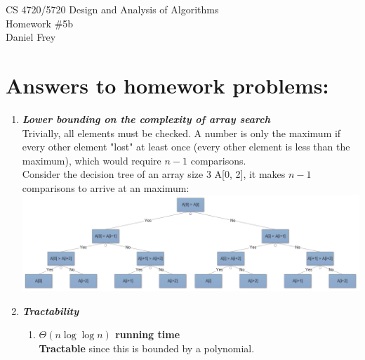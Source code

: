 \documentclass[11pt]{article}
\begin{document}
 

\rhead{\today}

\begin{center}
\begin{Large}
	CS 4720/5720 Design and Analysis of Algorithms \\
	Homework \#5b \\
	Daniel Frey
\end{Large}
\end{center}

\section*{Answers to homework problems:}

\begin{enumerate}
	\item
		\textbf{\textit{Lower bounding on the complexity of array search}} \\
			\hspace*{.5cm}
			Trivially, all elements must be checked. A number is only the maximum if every other element "lost" at least once (every other element is less than the maximum), which would require $ n-1 $ comparisons. \\
			\hspace*{.5cm}
			Consider the decision tree of an array size 3 A[0, 2], it makes $ n-1 $ comparisons to arrive at an maximum: \\
			\includegraphics[width=\textwidth]{"Decision Tree"} \\

	\item
		\textbf{\textit{Tractability}} \\
		\begin{enumerate}
		\item
			\textbf{\textit{$ \Theta(n \log \log n) $} running time} \\
				\hspace*{.5cm} 
				\textbf{Tractable} since this is bounded by a polynomial. \\
			

\end{enumerate}
\end{enumerate}
\end{document}
